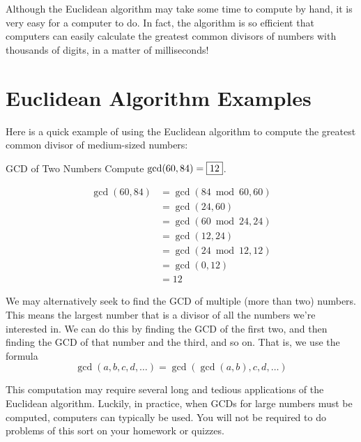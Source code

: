 \documentclass[a4paper,10pt]{report}
\begin{document}
Although the Euclidean algorithm may take some time to compute by hand, it is
very easy for a computer to do. In fact, the algorithm is so efficient that
computers can easily calculate the greatest common divisors of numbers with
thousands of digits, in a matter of milliseconds!

\section{Euclidean Algorithm Examples}

Here is a quick example of using the Euclidean algorithm to compute the
greatest common divisor of medium-sized numbers:

\begin{problem}{GCD of Two Numbers}
 Compute $\gcd(60, 84) = \Ans{12}$.

 \begin{solution}
  \begin{align*}
   \gcd(60, 84)
   &= \gcd(84 \bmod 60, 60) \\
   &= \gcd(24, 60) \\
   &= \gcd(60 \bmod 24, 24) \\
   &= \gcd(12, 24) \\
   &= \gcd(24 \bmod 12, 12) \\
   &= \gcd(0, 12) \\
   &= 12
  \end{align*}
 \end{solution}
\end{problem}

We may alternatively seek to find the GCD of multiple (more than two) numbers.
This means the largest number that is a divisor of all the numbers we're
interested in. We can do this by finding the GCD of the first two, and then
finding the GCD of that number and the third, and so on. That is, we use the
formula \[
 \gcd(a, b, c, d, \dots) = \gcd(\gcd(a, b), c, d, \dots)
\]

This computation may require several long and tedious applications of the
Euclidean algorithm. Luckily, in practice, when GCDs for large numbers must be
computed, computers can typically be used. You will not be required to do
problems of this sort on your homework or quizzes.
\end{document}

